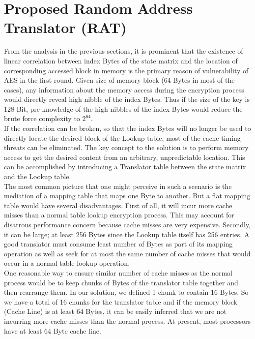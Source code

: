 \section{Proposed Random Address Translator (RAT)}

From the analysis in the previous sections, it is prominent that the existence of linear correlation between index Bytes of the state matrix and the location of corresponding accessed block in memory is the primary reason of vulnerability of AES in the first round. Given size of memory block (64 Bytes in most of the cases), any information about the memory access during the encryption process would directly reveal high nibble of the index Bytes. Thus if the size of the key is 128 Bit, pre-knowledge of the high nibbles of the index Bytes would reduce the brute force complexity to $2^{64}$.\\

If the correlation can be broken, so that the index Bytes will no longer be used to directly locate the desired block of the Lookup table, most of the cache-timing threats can be eliminated. The key concept to the solution is to perform memory access to get the desired content from an arbitrary, unpredictable location. This can be accomplished by introducing a Translator table between the state matrix and the Lookup table.\\

The most common picture that one might perceive in such a scenario is the mediation of a mapping table that maps one Byte to another. But a flat mapping table would have several disadvantages. First of all, it will incur more cache misses than a normal table lookup encryption process. This may account for disatrous performance concern because cache misses are very expensive. Secondly, it can be large; at least 256 Bytes since the Lookup table itself has 256 entries. A good translator must consume least number of Bytes as part of its mapping operation as well as seek for at most the same number of cache misses that would occur in a normal table lookup operation.\\

One reasonable way to ensure similar number of cache misses as the normal process would be to keep chunks of Bytes of the translator table together and then rearrange them. In our solution, we defined 1 chunk to contain 16 Bytes. So we have a total of 16 chunks for the translator table and if the memory block (Cache Line) is at least 64 Bytes, it can be easily inferred that we are not incurring more cache misses than the normal process. At present, most processors have at least 64 Byte cache line.\\

